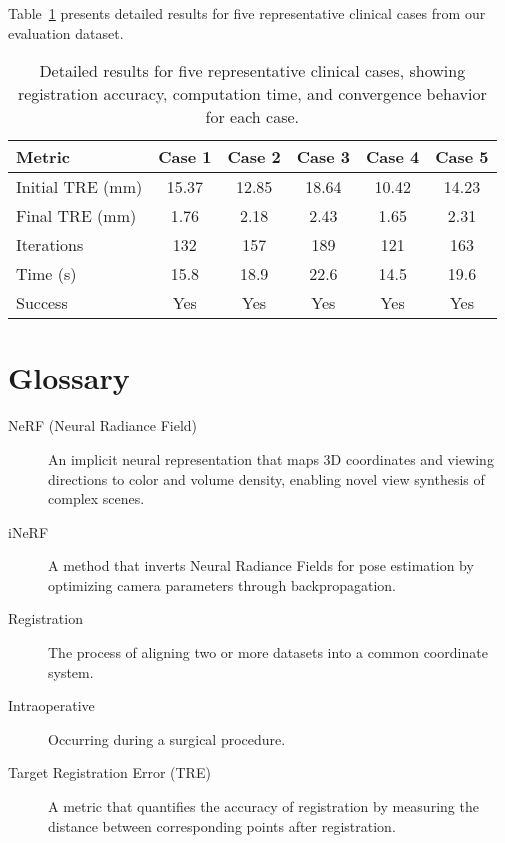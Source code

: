 \begin{appendices}
Table~\ref{tab:case_studies} presents detailed results for five representative clinical cases from our evaluation dataset.

\begin{table}[htpb]
  \caption[Detailed results for clinical case studies]{Detailed results for five representative clinical cases, showing registration accuracy, computation time, and convergence behavior for each case.}\label{tab:case_studies}
  \centering
  \begin{tabular}{l c c c c c}
    \toprule
      Metric & Case 1 & Case 2 & Case 3 & Case 4 & Case 5 \\
    \midrule
      Initial TRE (mm) & 15.37 & 12.85 & 18.64 & 10.42 & 14.23 \\
      Final TRE (mm) & 1.76 & 2.18 & 2.43 & 1.65 & 2.31 \\
      Iterations & 132 & 157 & 189 & 121 & 163 \\
      Time (s) & 15.8 & 18.9 & 22.6 & 14.5 & 19.6 \\
      Success & Yes & Yes & Yes & Yes & Yes \\
    \bottomrule
  \end{tabular}
\end{table}

\chapter{Glossary}\label{appendix:glossary}

\begin{description}
    \item[NeRF (Neural Radiance Field)] An implicit neural representation that maps 3D coordinates and viewing directions to color and volume density, enabling novel view synthesis of complex scenes.
    
    \item[iNeRF] A method that inverts Neural Radiance Fields for pose estimation by optimizing camera parameters through backpropagation.
    
    \item[Registration] The process of aligning two or more datasets into a common coordinate system.
    
    \item[Intraoperative] Occurring during a surgical procedure.
    
    \item[Target Registration Error (TRE)] A metric that quantifies the accuracy of registration by measuring the distance between corresponding points after registration.
    

\end{description}
\end{appendices}
